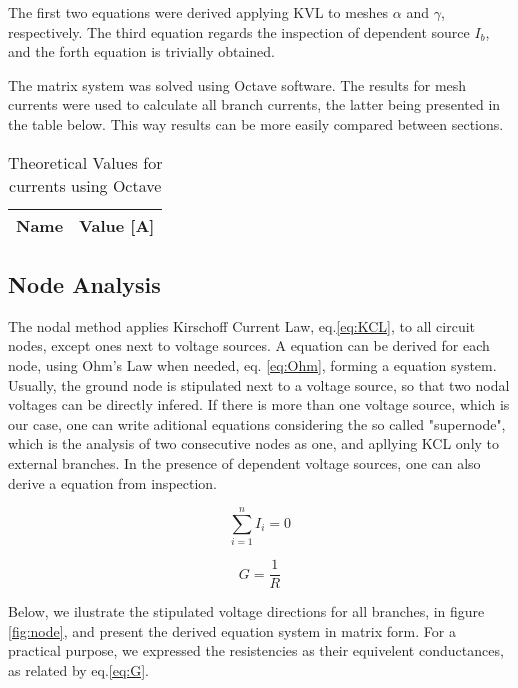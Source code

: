 \par The first two equations were derived applying KVL to meshes $\alpha$ and $\gamma$, respectively. The third equation regards the inspection of dependent source $I_b$, and the forth equation is trivially obtained.

\par The matrix system was solved using Octave software. The results for mesh currents were used to calculate all branch currents, the latter being presented in the table below. This way results can be more easily compared between sections.



\begin{table}[H]
  \centering
  \begin{tabular}{|l|r|}
    \hline
    {\bf Name} & {\bf Value [A]} \\ \hline
    
  \end{tabular}
  \caption{Theoretical Values for currents using Octave}
  \label{tab:TCurrents}
\end{table}

\subsection{Node Analysis}
\par The nodal method applies Kirschoff Current Law, eq.\ref{eq:KCL}, to all circuit nodes, except ones next to voltage sources. A equation can be derived for each node, using Ohm's Law when needed, eq. \ref{eq:Ohm}, forming a equation system. Usually, the ground node is stipulated next to a voltage source, so that two nodal voltages can be directly infered. If there is more than one voltage source, which is our case, one can write aditional equations considering the so called "supernode", which is the analysis of two consecutive nodes as one, and apllying KCL only to external branches. In the presence of dependent voltage sources, one can also derive a equation from inspection. 
\begin{multicols}{2}
\begin{equation}
    \sum_{i=1}^{n} I_i = 0
    \label{eq:KCL}
\end{equation}

\begin{equation}
    G = \frac{1}{R}
    \label{eq:G}
\end{equation}
\end{multicols}

Below, we ilustrate the stipulated voltage directions for all branches, in figure \ref{fig:node}, and present the derived equation system in matrix form. For a practical purpose, we expressed the resistencies as their equivelent conductances, as related by eq.\ref{eq:G}.



